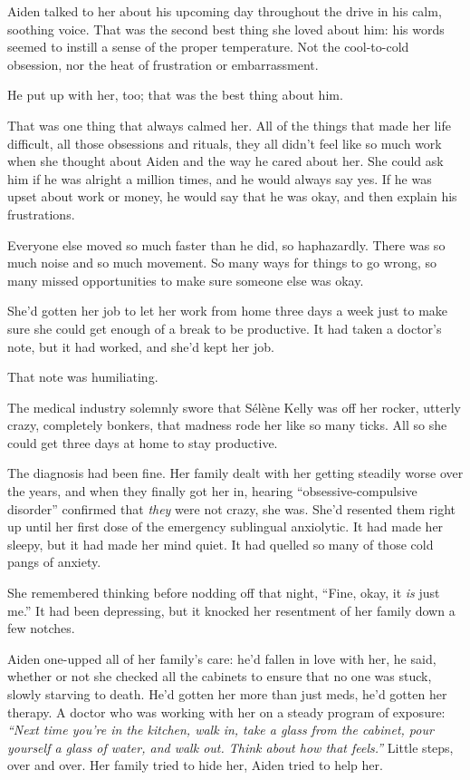 Aiden talked to her about his upcoming day throughout the drive in his calm, soothing voice. That was the second best thing she loved about him: his words seemed to instill a sense of the proper temperature. Not the cool-to-cold obsession, nor the heat of frustration or embarrassment.

He put up with her, too; that was the best thing about him.

That was one thing that always calmed her. All of the things that made her life difficult, all those obsessions and rituals, they all didn't feel like so much work when she thought about Aiden and the way he cared about her. She could ask him if he was alright a million times, and he would always say yes. If he was upset about work or money, he would say that he was okay, and then explain his frustrations.

Everyone else moved so much faster than he did, so haphazardly. There was so much noise and so much movement. So many ways for things to go wrong, so many missed opportunities to make sure someone else was okay.

She'd gotten her job to let her work from home three days a week just to make sure she could get enough of a break to be productive. It had taken a doctor's note, but it had worked, and she'd kept her job.

That note was humiliating.

The medical industry solemnly swore that Sélène Kelly was off her rocker, utterly crazy, completely bonkers, that madness rode her like so many ticks. All so she could get three days at home to stay productive.

The diagnosis had been fine. Her family dealt with her getting steadily worse over the years, and when they finally got her in, hearing ``obsessive-compulsive disorder'' confirmed that \emph{they} were not crazy, she was. She'd resented them right up until her first dose of the emergency sublingual anxiolytic. It had made her sleepy, but it had made her mind quiet. It had quelled so many of those cold pangs of anxiety.

She remembered thinking before nodding off that night, ``Fine, okay, it \emph{is} just me.'' It had been depressing, but it knocked her resentment of her family down a few notches.

Aiden one-upped all of her family's care: he'd fallen in love with her, he said, whether or not she checked all the cabinets to ensure that no one was stuck, slowly starving to death. He'd gotten her more than just meds, he'd gotten her therapy. A doctor who was working with her on a steady program of exposure: \emph{``Next time you're in the kitchen, walk in, take a glass from the cabinet, pour yourself a glass of water, and walk out. Think about how that feels.''} Little steps, over and over. Her family tried to hide her, Aiden tried to help her.

